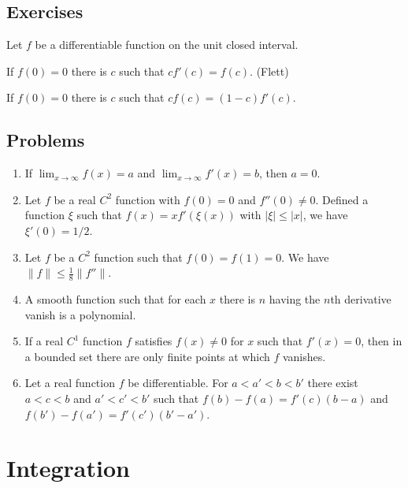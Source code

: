 \documentclass{../../large}
\begin{document}
\section*{Exercises}
\begin{prb}
Let $f$ be a differentiable function on the unit closed interval.
\begin{parts}
\item If $f(0)=0$ there is $c$ such that $cf'(c)=f(c)$. (Flett)
\item If $f(0)=0$ there is $c$ such that $cf(c)=(1-c)f'(c)$.
\end{parts}
\end{prb}
\begin{prb}
\end{prb}
\begin{prb}
\end{prb}

\section*{Problems}
\begin{enumerate}
\item If $\lim_{x\to\infty}f(x)=a$ and $\lim_{x\to\infty}f'(x)=b$, then $a=0$.
\item Let $f$ be a real $C^2$ function with $f(0)=0$ and $f''(0)\ne0$.
Defined a function $\xi$ such that $f(x)=xf'(\xi(x))$ with $|\xi|\le|x|$, we have $\xi'(0)=1/2$.
\item Let $f$ be a $C^2$ function such that $f(0)=f(1)=0$.
We have $\|f\|\le\frac18\|f''\|$.
\item A smooth function such that for each $x$ there is $n$ having the $n$th derivative vanish is a polynomial.
\item If a real $C^1$ function $f$ satisfies $f(x)\ne0$ for $x$ such that $f'(x)=0$, then in a bounded set there are only finite points at which $f$ vanishes.
\item Let a real function $f$ be differentiable.
For $a<a'<b<b'$ there exist $a<c<b$ and $a'<c'<b'$ such that $f(b)-f(a)=f'(c)(b-a)$ and $f(b')-f(a')=f'(c')(b'-a')$.
\end{enumerate}






\chapter{Integration}
\end{document}
